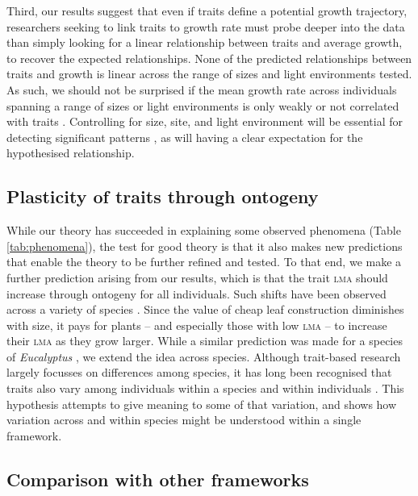\documentclass[9pt,twocolumn,twoside,lineno]{pnas-new}
\newcommand{\lma}{\textsc{lma}}
\begin{document}
Third, our results suggest that even if traits define a potential growth trajectory, researchers seeking to link traits to growth rate must probe deeper into the data than simply looking for a linear relationship between traits and average growth, to recover the expected relationships. None of the predicted relationships between traits and growth is linear across the range of sizes and light environments tested. As such, we should not be surprised if the mean growth rate across individuals spanning a range of sizes or light environments is only weakly or not correlated with traits \citep[e.g.][]{Poorter-2008,Paine-2015}. Controlling for size, site, and light environment will be essential for detecting significant patterns \citep[e.g.][]{Gibert-2016}, as will having a clear expectation for the hypothesised relationship.

\subsection{Plasticity of traits through ontogeny}

While our theory has succeeded in explaining some observed phenomena (Table \ref{tab:phenomena}), the test for good theory is that it also makes new predictions that enable the theory to be further refined and tested. To that end, we make a further prediction arising from our results, which is that the trait {\lma} should increase through ontogeny for all individuals. Such shifts have been observed across a variety of species \citep{King-1999,Thomas-1999,Koch-2004}. Since the value of cheap leaf construction diminishes with size, it pays for plants -- and especially those with low {\lma} -- to increase their {\lma} as they grow larger. While a similar prediction was made for a species of \emph{Eucalyptus} \citep{King-1999}, we extend the idea across species. Although trait-based research largely focusses on differences among species, it has long been recognised that traits also vary among individuals within a species and within individuals \citep{Westoby-2002}. This hypothesis attempts to give meaning to some of that variation, and shows how variation across and within species might be understood within a single framework.

\subsection{Comparison with other frameworks}
\end{document}
